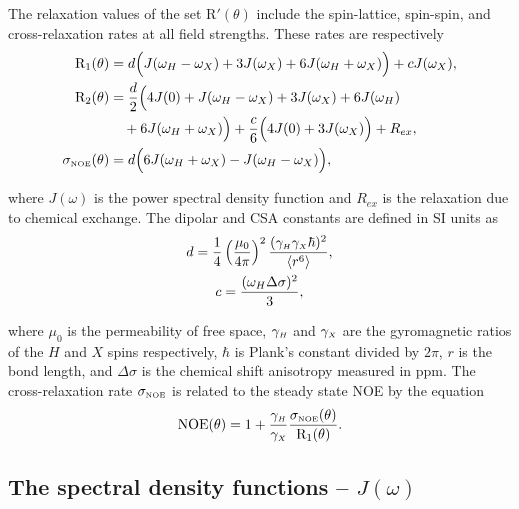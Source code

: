 \begin{htmlonly}
\begin{htmlonly}
The relaxation values of the set R$'(\theta)$ include the spin-lattice, spin-spin, and cross-relaxation rates at all field strengths.
These rates are respectively \citep{Abragam61}
\begin{subequations}
\begin{align}
    \mathrm{R}_1(\theta) &= d \Big( J(\omega_H - \omega_X) + 3J(\omega_X) + 6J(\omega_H + \omega_X) \Big) + cJ(\omega_X),     \label{eq: R1} \\
    \mathrm{R}_2(\theta) &= \frac{d}{2} \Big( 4J(0) + J(\omega_H - \omega_X) + 3J(\omega_X) + 6J(\omega_H)                    \nonumber \\
        & \quad + 6J(\omega_H + \omega_X) \Big) + \frac{c}{6} \Big( 4J(0) + 3J(\omega_X) \Big) + R_{ex},              \label{eq: R2} \\  
    \sigma_{\scriptscriptstyle \mathrm{NOE}}(\theta) &= d \Big( 6J(\omega_H + \omega_X) - J(\omega_H - \omega_X) \Big),                              \label{eq: sigma_NOE}
\end{align}
\end{subequations}

\noindent where $J(\omega)$ is the power spectral density function and $R_{ex}$ is the relaxation due to chemical exchange.
The dipolar and CSA constants are defined in SI units as
\begin{gather}
 d = \frac{1}{4} \left(\frac{\mu_0}{4\pi}\right)^2 \frac{(\gamma_{\scriptscriptstyle H} \gamma_{\scriptscriptstyle X} \hbar)^2}{\langle r^6 \rangle}, \label{eq: dipolar constant} \\
 c = \frac{(\omega_H \Delta\sigma)^2}{3}, \label{eq: CSA constant}
\end{gather}

\noindent where $\mu_0$ is the permeability of free space, $\gamma_{\scriptscriptstyle H}$ and $\gamma_{\scriptscriptstyle X}$ are the gyromagnetic ratios of the $H$ and $X$ spins respectively, $\hbar$ is Plank's constant divided by $2\pi$, $r$ is the bond length, and $\Delta\sigma$ is the chemical shift anisotropy measured in ppm.
The cross-relaxation rate $\sigma_{\scriptscriptstyle \mathrm{NOE}}$ is related to the steady state NOE by the equation
\begin{equation} \label{eq: NOE}
 \mathrm{NOE}(\theta) = 1 + \frac{\gamma_{\scriptscriptstyle H}}{\gamma_{\scriptscriptstyle X}} \frac{\sigma_{\scriptscriptstyle \mathrm{NOE}}(\theta)}{\mathrm{R}_1(\theta)}.
\end{equation}



\begin{latexonly}
    \subsection{The spectral density functions -- $J(\omega)$}
\end{latexonly}
\begin{htmlonly}

\end{htmlonly}
\end{htmlonly}
\end{htmlonly}
